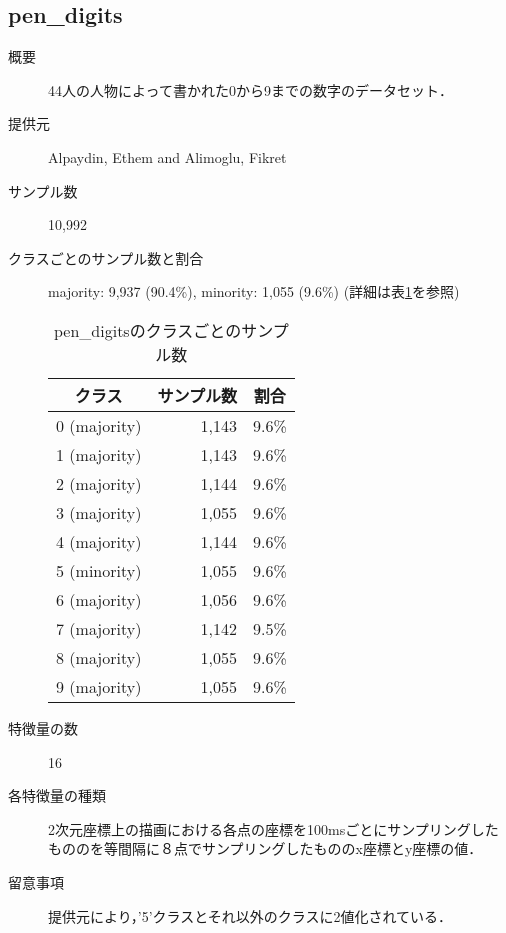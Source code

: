 \subsection{pen\_digits}
\begin{description}
    \item[概要] 44人の人物によって書かれた0から9までの数字のデータセット．\cite{pendigits}
    \item[提供元] Alpaydin, Ethem and Alimoglu, Fikret
    \item[サンプル数] 10,992
    \item[クラスごとのサンプル数と割合] majority: 9,937 (90.4\%), minority: 1,055 (9.6\%) (詳細は表\ref{tab:pendigits}を参照)
        \begin{table}
            \centering
            \caption{pen\_digitsのクラスごとのサンプル数}
            \label{tab:pendigits}
            \begin{tabular}{lrc} \hline
                \multicolumn{1}{c}{クラス}&
                \multicolumn{1}{c}{サンプル数}&
                \multicolumn{1}{c}{割合}\\
                \hline
                \hline
                0 (majority)& 1,143 & 9.6\% \\
                1 (majority)& 1,143 & 9.6\% \\
                2 (majority)& 1,144 & 9.6\% \\
                3 (majority)& 1,055 & 9.6\% \\
                4 (majority)& 1,144 & 9.6\% \\
                5 (minority)& 1,055 & 9.6\% \\
                6 (majority)& 1,056 & 9.6\% \\
                7 (majority)& 1,142 & 9.5\% \\
                8 (majority)& 1,055 & 9.6\% \\
                9 (majority)& 1,055 & 9.6\% \\
                \hline
            \end{tabular}
        \end{table}
    \item[特徴量の数] 16
    \item[各特徴量の種類] \mbox{}
        2次元座標上の描画における各点の座標を100msごとにサンプリングしたもののを等間隔に８点でサンプリングしたもののx座標とy座標の値．
    \item[留意事項]  提供元により，'5'クラスとそれ以外のクラスに2値化されている．
\end{description}

